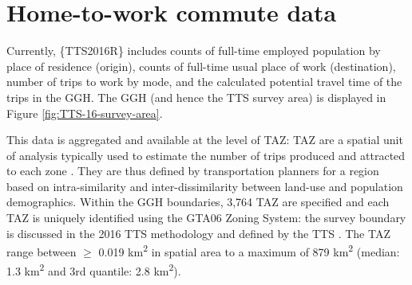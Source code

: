 \documentclass[Royal,times,sageh]{sagej}
\begin{document}
\hypertarget{home-to-work-commute-data}{%
\section{Home-to-work commute data}\label{home-to-work-commute-data}}

Currently, \{TTS2016R\} includes counts of full-time employed population
by place of residence (origin), counts of full-time usual place of work
(destination), number of trips to work by mode, and the calculated
potential travel time of the trips in the GGH. The GGH (and hence the
TTS survey area) is displayed in Figure \ref{fig:TTS-16-survey-area}.

This data is aggregated and available at the level of TAZ: TAZ are a
spatial unit of analysis typically used to estimate the number of trips
produced and attracted to each zone \citep{meyer_urban_2001}. They are
thus defined by transportation planners for a region based on
intra-similarity and inter-dissimilarity between land-use and population
demographics. Within the GGH boundaries, 3,764 TAZ are specified and
each TAZ is uniquely identified using the GTA06 Zoning System: the
survey boundary is discussed in the 2016 TTS methodology and defined by
the TTS \citep{data_management_group_tts_2018}. The TAZ range between
\(\ge\) 0.019 km\textsuperscript{2} in spatial area to a maximum of 879
km\textsuperscript{2} (median: 1.3 km\textsuperscript{2} and 3rd
quantile: 2.8 km\textsuperscript{2}).
\end{document}
